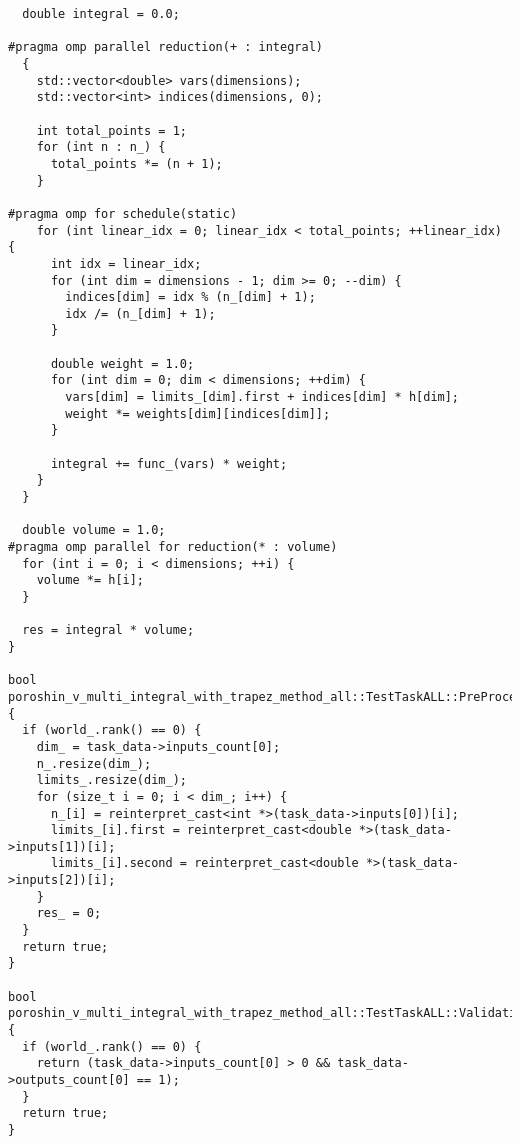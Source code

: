 \documentclass[12pt]{article}
\begin{document}
\begin{lstlisting}
  double integral = 0.0;

#pragma omp parallel reduction(+ : integral)
  {
    std::vector<double> vars(dimensions);
    std::vector<int> indices(dimensions, 0);

    int total_points = 1;
    for (int n : n_) {
      total_points *= (n + 1);
    }

#pragma omp for schedule(static)
    for (int linear_idx = 0; linear_idx < total_points; ++linear_idx) {
      int idx = linear_idx;
      for (int dim = dimensions - 1; dim >= 0; --dim) {
        indices[dim] = idx % (n_[dim] + 1);
        idx /= (n_[dim] + 1);
      }

      double weight = 1.0;
      for (int dim = 0; dim < dimensions; ++dim) {
        vars[dim] = limits_[dim].first + indices[dim] * h[dim];
        weight *= weights[dim][indices[dim]];
      }

      integral += func_(vars) * weight;
    }
  }

  double volume = 1.0;
#pragma omp parallel for reduction(* : volume)
  for (int i = 0; i < dimensions; ++i) {
    volume *= h[i];
  }

  res = integral * volume;
}

bool poroshin_v_multi_integral_with_trapez_method_all::TestTaskALL::PreProcessingImpl() {
  if (world_.rank() == 0) {
    dim_ = task_data->inputs_count[0];
    n_.resize(dim_);
    limits_.resize(dim_);
    for (size_t i = 0; i < dim_; i++) {
      n_[i] = reinterpret_cast<int *>(task_data->inputs[0])[i];
      limits_[i].first = reinterpret_cast<double *>(task_data->inputs[1])[i];
      limits_[i].second = reinterpret_cast<double *>(task_data->inputs[2])[i];
    }
    res_ = 0;
  }
  return true;
}

bool poroshin_v_multi_integral_with_trapez_method_all::TestTaskALL::ValidationImpl() {
  if (world_.rank() == 0) {
    return (task_data->inputs_count[0] > 0 && task_data->outputs_count[0] == 1);
  }
  return true;
}


\end{lstlisting}
\end{document}
